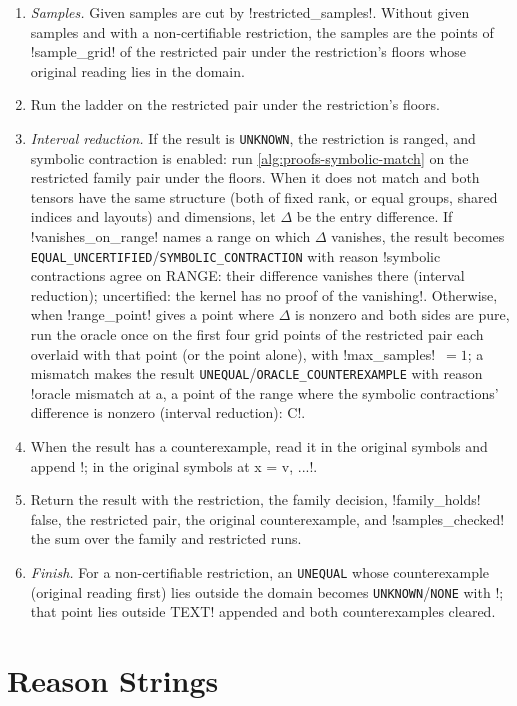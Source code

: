 \begin{algorithm}
\begin{enumerate}
\item \emph{Samples.} Given samples are cut by \py!restricted_samples!. Without given samples and with a non-certifiable restriction, the samples are the points of \py!sample_grid! of the restricted pair under the restriction's floors whose original reading lies in the domain.
\item Run the ladder on the restricted pair under the restriction's floors.
\item \emph{Interval reduction.} If the result is \texttt{UNKNOWN}, the restriction is ranged, and symbolic contraction is enabled: run \cref{alg:proofs-symbolic-match} on the restricted family pair under the floors. When it does not match and both tensors have the same structure (both of fixed rank, or equal groups, shared indices and layouts) and dimensions, let $\Delta$ be the entry difference. If \py!vanishes_on_range! names a range on which $\Delta$ vanishes, the result becomes \texttt{EQUAL\_UNCERTIFIED}/\texttt{SYMBOLIC\_CONTRACTION} with reason \code!symbolic contractions agree on RANGE: their difference vanishes there (interval reduction); uncertified: the kernel has no proof of the vanishing!. Otherwise, when \py!range_point! gives a point where $\Delta$ is nonzero and both sides are pure, run the oracle once on the first four grid points of the restricted pair each overlaid with that point (or the point alone), with \py!max_samples!~$=1$; a mismatch makes the result \texttt{UNEQUAL}/\texttt{ORACLE\_COUNTEREXAMPLE} with reason \code!oracle mismatch at {a}, a point of the range where the symbolic contractions' difference is nonzero (interval reduction): C!.
\item When the result has a counterexample, read it in the original symbols and append \code!; in the original symbols at x = v, ...!.
\item Return the result with the restriction, the family decision, \py!family_holds! false, the restricted pair, the original counterexample, and \py!samples_checked! the sum over the family and restricted runs.
\item \emph{Finish.} For a non-certifiable restriction, an \texttt{UNEQUAL} whose counterexample (original reading first) lies outside the domain becomes \texttt{UNKNOWN}/\texttt{NONE} with \code!; that point lies outside TEXT! appended and both counterexamples cleared.
\end{enumerate}
\end{algorithm}

\section{Reason Strings}\label{sec:proofs-reasons}

